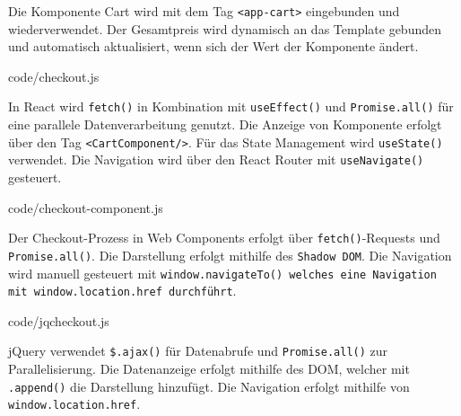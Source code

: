 \documentclass[oneside]{ausarbeitung}
\begin{document}
Die Komponente Cart wird mit dem Tag \texttt{<app-cart>} eingebunden und wiederverwendet. Der Gesamtpreis wird dynamisch an das Template gebunden und automatisch aktualisiert, wenn sich der Wert der Komponente ändert.

 {code/checkout.js}

In React wird \texttt{fetch()} in Kombination mit \texttt{useEffect()} und \texttt{Promise.all()} für eine parallele Datenverarbeitung genutzt. Die Anzeige von Komponente erfolgt über den Tag \texttt{<CartComponent/>}. Für das State Management wird \texttt{useState()} verwendet. Die Navigation wird über den React Router mit \texttt{useNavigate()} gesteuert.

 {code/checkout-component.js}

Der Checkout-Prozess in Web Components erfolgt über \texttt{fetch()}-Requests und \texttt{Promise.all()}. Die Darstellung erfolgt mithilfe des \texttt{Shadow DOM}. Die Navigation wird manuell gesteuert mit \texttt{window.navigateTo() welches eine Navigation mit \texttt{window.location.href} durchführt}.

 {code/jqcheckout.js}

jQuery verwendet \texttt{\$.ajax()} für Datenabrufe und \texttt{Promise.all()} zur Parallelisierung. Die Datenanzeige erfolgt mithilfe des DOM, welcher mit \texttt{.append()} die Darstellung hinzufügt. Die Navigation erfolgt mithilfe von \texttt{window.location.href}.
\end{document}
